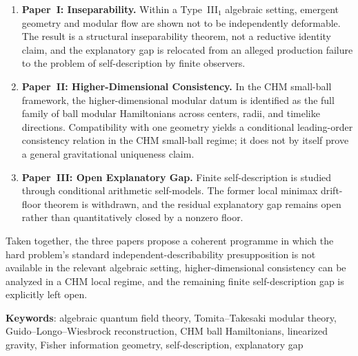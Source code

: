\documentclass[12pt,a4paper,openany]{book}
\begin{document}
\begin{enumerate}
\item \textbf{Paper~I: Inseparability.} Within a Type~III$_1$
algebraic setting, emergent geometry and modular flow are shown not to
be independently deformable. The result is a structural inseparability
theorem, not a reductive identity claim, and the explanatory gap is
relocated from an alleged production failure to the problem of
self-description by finite observers.

\item \textbf{Paper~II: Higher-Dimensional Consistency.} In the CHM
small-ball framework, the higher-dimensional modular datum is identified
as the full family of ball modular Hamiltonians across centers, radii,
and timelike directions. Compatibility with one geometry yields a
conditional leading-order consistency relation in the CHM small-ball
regime; it does not by itself prove a general gravitational uniqueness
claim.

\item \textbf{Paper~III: Open Explanatory Gap.} Finite self-description
is studied through conditional arithmetic self-models. The former local
minimax drift-floor theorem is withdrawn, and the residual explanatory
gap remains open rather than quantitatively closed by a nonzero floor.
\end{enumerate}

Taken together, the three papers propose a coherent programme in which
the hard problem's standard independent-describability presupposition is
not available in the relevant algebraic setting, higher-dimensional
consistency can be analyzed in a CHM local regime, and the remaining
finite self-description gap is explicitly left open.

\bigskip
\noindent\textbf{Keywords}: algebraic quantum field theory, Tomita--Takesaki
modular theory, Guido--Longo--Wiesbrock reconstruction, CHM ball
Hamiltonians, linearized gravity, Fisher information geometry,
self-description, explanatory gap

\tableofcontents

\mainmatter






\end{document}
